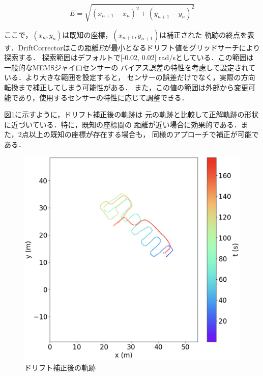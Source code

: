 \begin{equation}
    E = \sqrt{(x_{n+1} - x_n)^2 + (y_{n+1} - y_n)^2}
\end{equation}

ここで，$(x_n, y_n)$は既知の座標，$(x_{n+1}, y_{n+1})$は補正された
軌跡の終点を表す．DriftCorrectorはこの距離$E$が最小となるドリフト値をグリッドサーチにより探索する．
探索範囲はデフォルトで[-0.02, 0.02] rad/sとしている．この範囲は一般的なMEMSジャイロセンサーの
バイアス誤差の特性を考慮して設定されている．より大きな範囲を設定すると，
センサーの誤差だけでなく，実際の方向転換まで補正してしまう可能性がある．
また，この値の範囲は外部から変更可能であり，使用するセンサーの特性に応じて調整できる．


図\ref{fig:pdr-remove-drift}に示すように，ドリフト補正後の軌跡は
元の軌跡と比較して正解軌跡の形状に近づいている．特に，既知の座標間の
距離が近い場合に効果的である．また，2点以上の既知の座標が存在する場合も，
同様のアプローチで補正が可能である．

\begin{figure}[H]
	\centering
	\includegraphics[width=\linewidth]{image/pdr-remove-drift-two.jpg}
	\caption{ドリフト補正後の軌跡}    \label{fig:pdr-remove-drift}
\end{figure}

